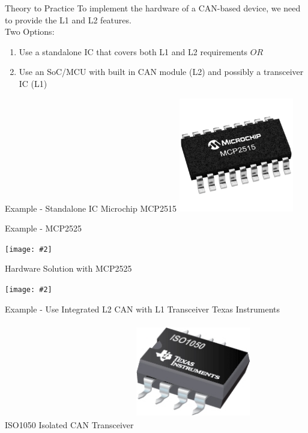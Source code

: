 \documentclass{beamer}
\newcommand {\framedgraphic}[2] {
    \begin{frame}{#1}
        \begin{center}
            \texttt{[image: \#2]}
        \end{center}
    \end{frame}
}
\begin{document}
    \begin{frame}{Theory to Practice}
      To implement the hardware of a CAN-based device, we need to provide the L1 and L2 features.\\
      Two Options:
      \begin{enumerate}
      \item{Use a standalone IC that covers both L1 and L2 requirements $OR$}
      \item{Use an SoC/MCU with built in CAN module (L2) and possibly a transceiver IC (L1)}
      \end{enumerate}
      \end{frame}

      \begin{frame}{Example - Standalone IC}
        \huge{Microchip MCP2515}
        \centering
            \includegraphics[height=5cm, width=5cm, keepaspectratio=true]{./images/mcp2515_pic}
      \end{frame}

      
     \framedgraphic{Example - MCP2525}{./images/mcp2515_blockdiagram}

     \framedgraphic{Hardware Solution with MCP2525}{./images/mcp2525_soln}

     \begin{frame}{Example - Use Integrated L2 CAN with L1 Transceiver}
        \huge{Texas Instruments ISO1050 Isolated CAN Transceiver}
        \centering
            \includegraphics[height=5cm, width=5cm, keepaspectratio=true]{./images/ISO1050}
     \end{frame}
\end{document}
